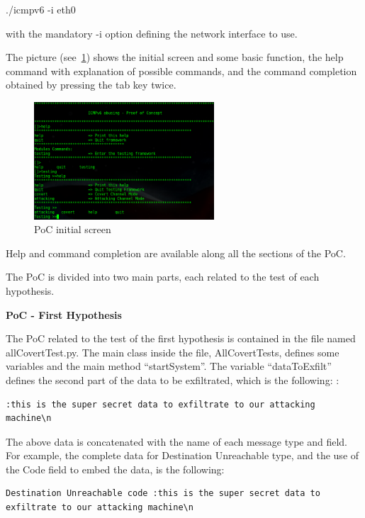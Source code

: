 \documentclass[12pt]{article}
\begin{document}
./icmpv6 -i eth0

with the mandatory -i option defining the network interface to use.

The picture (see~\ref{fig:pocMain}) shows the initial screen and some basic function, the help command with explanation of possible commands, and the command completion obtained by pressing the tab key twice.

\begin{figure}[ht] 
\begin{center}
\includegraphics[width=0.6\textwidth]{pocMain}
\caption{PoC initial screen}
\label{fig:pocMain}
\end{center}
\end{figure}


Help and command completion are available along all the sections of the PoC.

The PoC is divided into two main parts, each related to the test of each hypothesis.


\textbf{PoC - First Hypothesis}


The PoC related to the test of the first hypothesis is contained in the file named allCovertTest.py. The main class inside the file, AllCovertTests, defines some variables and the main method ``startSystem''. The variable ``dataToExfilt'' defines the second part of the data to be exfiltrated, which is the following: : 

\begin{lstlisting}[style=python,basicstyle=\ttfamily\small]
 :this is the super secret data to exfiltrate to our attacking machine\n
\end{lstlisting}

\vspace{-15pt}
The above data is concatenated with the name of each message type and field. For example, the complete data for Destination Unreachable type, and the use of the Code field to embed the data, is the following:
\begin{lstlisting}[style=python,basicstyle=\ttfamily\small]
 Destination Unreachable code :this is the super secret data to exfiltrate to our attacking machine\n
\end{lstlisting}
\end{document}
